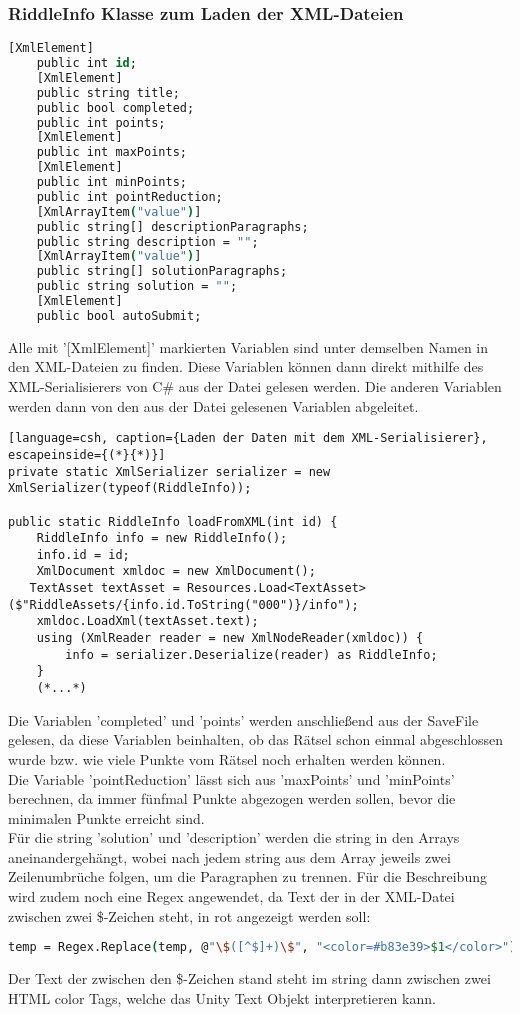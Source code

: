 \subsubsection{RiddleInfo Klasse zum Laden der XML-Dateien}
\label{sub:RiddleInfo}
\begin{lstlisting}[language=csh, caption={In der Klasse gespeicherte Daten}]
	[XmlElement]
    public int id;
    [XmlElement]
    public string title;
    public bool completed;
    public int points;
    [XmlElement]
    public int maxPoints;
    [XmlElement]
    public int minPoints;
    public int pointReduction;
    [XmlArrayItem("value")]
    public string[] descriptionParagraphs;
    public string description = "";
    [XmlArrayItem("value")]
    public string[] solutionParagraphs;
    public string solution = "";
    [XmlElement]
    public bool autoSubmit;
\end{lstlisting}
Alle mit '[XmlElement]' markierten Variablen sind unter demselben Namen in den XML-Dateien zu finden. Diese Variablen können dann direkt mithilfe des XML-Serialisierers von C\# aus der Datei gelesen werden. Die anderen Variablen werden dann von den aus der Datei gelesenen Variablen abgeleitet.\\
\begin{lstlisting}[language=csh, caption={Laden der Daten mit dem XML-Serialisierer}, escapeinside={(*}{*)}]
private static XmlSerializer serializer = new XmlSerializer(typeof(RiddleInfo));

public static RiddleInfo loadFromXML(int id) {
    RiddleInfo info = new RiddleInfo();
    info.id = id;
    XmlDocument xmldoc = new XmlDocument();
   TextAsset textAsset = Resources.Load<TextAsset>($"RiddleAssets/{info.id.ToString("000")}/info");
    xmldoc.LoadXml(textAsset.text);
    using (XmlReader reader = new XmlNodeReader(xmldoc)) {
        info = serializer.Deserialize(reader) as RiddleInfo;
    }
    (*...*)
\end{lstlisting}
Die Variablen 'completed' und 'points' werden anschließend aus der SaveFile gelesen, da diese Variablen beinhalten, ob das Rätsel schon einmal abgeschlossen wurde bzw. wie viele Punkte vom Rätsel noch erhalten werden können.\\
Die Variable 'pointReduction' lässt sich aus 'maxPoints' und 'minPoints' berechnen, da immer fünfmal Punkte abgezogen werden sollen, bevor die minimalen Punkte erreicht sind.\\
Für die string 'solution' und 'description' werden die string in den Arrays aneinandergehängt, wobei nach jedem string aus dem Array jeweils zwei Zeilenumbrüche folgen, um die Paragraphen zu trennen. Für die Beschreibung wird zudem noch eine Regex angewendet, da Text der in der XML-Datei zwischen zwei \$-Zeichen steht, in rot angezeigt werden soll:
\begin{lstlisting}[language=csh, caption={Regex um Text zwischen \$-Zeichen rot zu färben}]
temp = Regex.Replace(temp, @"\$([^$]+)\$", "<color=#b83e39>$1</color>");
\end{lstlisting}
Der Text der zwischen den \$-Zeichen stand steht im string dann zwischen zwei HTML color Tags, welche das Unity Text Objekt interpretieren kann.\\

